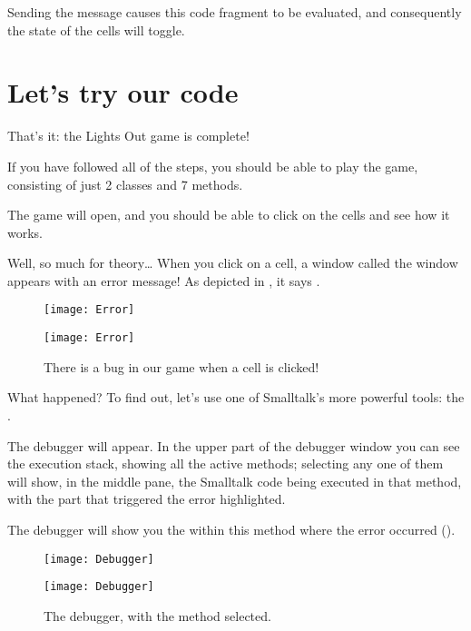 \documentclass[a4paper,10pt,twoside]{book}
\begin{document}
{ 

\noindent
Sending the  message causes this code fragment to be evaluated, and consequently the state of the cells will toggle.

\section{Let's try our code}

That's it: the Lights Out game is complete!

If you have followed all of the steps, you should be able to play the game, consisting of just 2 classes and 7 methods.


The game will open, and you should be able to click on the cells and see how it works.

Well, so much for theory\ldots{}
When you click on a cell, a  window called the window appears with an error message!
As depicted in , it says .

\begin{figure}[ht]
\ifluluelse
	{\centerline{\texttt{[image: Error]}}}
	{\centerline{\texttt{[image: Error]}}}
\caption{There is a bug in our game when a cell is clicked!
}
\end{figure}

\noindent
What happened? To find out, let's use one of Smalltalk's more powerful tools: the .

The debugger will appear.
In the upper part of the debugger window you can see the execution stack, showing all the active methods; selecting any one of them will show, in the middle pane, the Smalltalk code being executed in that method, with the part that triggered the error highlighted.

The debugger will show you the  within this method where the error occurred ().

\begin{figure}[ht]
\ifluluelse
	{\centerline {\texttt{[image: Debugger]}}}
	{\centerline {\texttt{[image: Debugger]}}}
\caption{The debugger, with the method   selected.
}
\end{figure}

}
\end{document}
